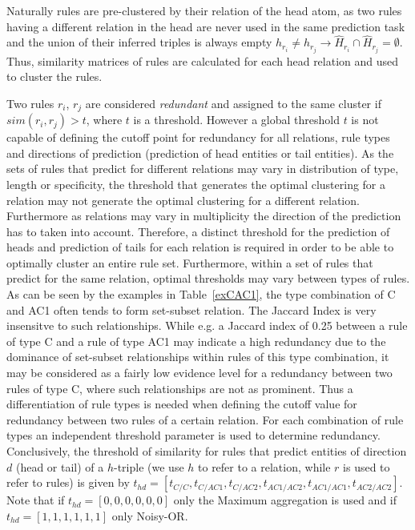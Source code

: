 \documentclass[akbc,twoside,11pt,lettersize]{article}
\begin{document}
Naturally rules are pre-clustered by their relation of the head atom, as two rules having a different relation in the head are never used in the same prediction task and the union of their inferred triples is always empty $h_{r_i} \neq h_{r_j} \rightarrow \hat{H}_{r_i} \cap \hat{H}_{r_j} = \emptyset$. Thus, similarity matrices of rules are calculated for each head relation and used to cluster the rules. 

Two rules $r_i$, $r_j$ are considered \textit{redundant} and assigned to the same cluster if $sim(r_i,r_j) > t$, where $t$ is a threshold. However a global threshold $t$ is not capable of defining the cutoff point for redundancy for all relations, rule types and directions of prediction (prediction of head entities or tail entities). As the sets of rules that predict for different relations may vary in distribution of type, length or specificity, the threshold that generates the optimal clustering for a relation may not generate the optimal clustering for a different relation. Furthermore as relations may vary in multiplicity the direction of the prediction has to taken into account. Therefore, a distinct threshold for the prediction of heads and prediction of tails for each relation is required in order to be able to optimally cluster an entire rule set. Furthermore, within a set of rules that predict for the same relation, optimal thresholds may vary between types of rules. As can be seen by the examples in Table~\ref{exCAC1}, the type combination of C and AC1 often tends to form set-subset relation. The Jaccard Index is very insensitve to such relationships. While e.g. a Jaccard index of 0.25 between a rule of type C and a rule of type AC1 may indicate a high redundancy due to the dominance of set-subset relationships within rules of this type combination, it may be considered as a fairly low evidence level for a redundancy between two rules of type C, where such relationships are not as prominent. Thus a differentiation of rule types is needed when defining the cutoff value for redundancy between two rules of a certain relation. For each combination of rule types an independent threshold parameter is used to determine redundancy. Conclusively, the threshold of similarity for rules that predict entities of direction $d$ (head or tail) of a $h$-triple (we use $h$ to refer to a relation, while $r$ is used to refer to rules) is given by $t_{hd} = [t_{C/C}, t_{C/AC1}, t_{C/AC2}, t_{AC1/AC2}, t_{AC1/AC1}, t_{AC2/AC2}]$. Note that if $t_{hd} = [0, 0, 0, 0, 0, 0]$ only the Maximum aggregation is used and if $t_{hd} = [1, 1, 1, 1, 1, 1]$ only Noisy-OR.
\end{document}
